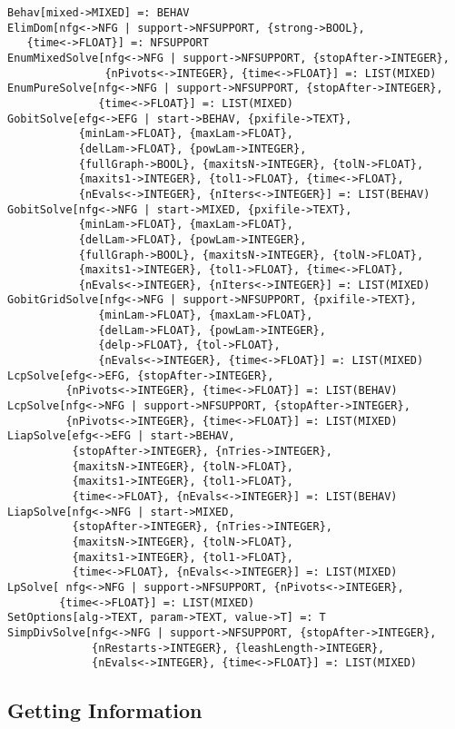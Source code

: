 \begin{verbatim}
Behav[mixed->MIXED] =: BEHAV
ElimDom[nfg<->NFG | support->NFSUPPORT, {strong->BOOL}, 
   {time<->FLOAT}] =: NFSUPPORT 
EnumMixedSolve[nfg<->NFG | support->NFSUPPORT, {stopAfter->INTEGER},
               {nPivots<->INTEGER}, {time<->FLOAT}] =: LIST(MIXED)
EnumPureSolve[nfg<->NFG | support->NFSUPPORT, {stopAfter->INTEGER}, 
              {time<->FLOAT}] =: LIST(MIXED) 
GobitSolve[efg<->EFG | start->BEHAV, {pxifile->TEXT},
           {minLam->FLOAT}, {maxLam->FLOAT},
           {delLam->FLOAT}, {powLam->INTEGER},
           {fullGraph->BOOL}, {maxitsN->INTEGER}, {tolN->FLOAT},
           {maxits1->INTEGER}, {tol1->FLOAT}, {time<->FLOAT},
           {nEvals<->INTEGER}, {nIters<->INTEGER}] =: LIST(BEHAV)
GobitSolve[nfg<->NFG | start->MIXED, {pxifile->TEXT},
           {minLam->FLOAT}, {maxLam->FLOAT},
           {delLam->FLOAT}, {powLam->INTEGER},
           {fullGraph->BOOL}, {maxitsN->INTEGER}, {tolN->FLOAT},
           {maxits1->INTEGER}, {tol1->FLOAT}, {time<->FLOAT},
           {nEvals<->INTEGER}, {nIters<->INTEGER}] =: LIST(MIXED)
GobitGridSolve[nfg<->NFG | support->NFSUPPORT, {pxifile->TEXT},
              {minLam->FLOAT}, {maxLam->FLOAT}, 
              {delLam->FLOAT}, {powLam->INTEGER}, 
              {delp->FLOAT}, {tol->FLOAT},
              {nEvals<->INTEGER}, {time<->FLOAT}] =: LIST(MIXED)
LcpSolve[efg<->EFG, {stopAfter->INTEGER},
         {nPivots<->INTEGER}, {time<->FLOAT}] =: LIST(BEHAV)
LcpSolve[nfg<->NFG | support->NFSUPPORT, {stopAfter->INTEGER},
         {nPivots<->INTEGER}, {time<->FLOAT}] =: LIST(MIXED)
LiapSolve[efg<->EFG | start->BEHAV, 
          {stopAfter->INTEGER}, {nTries->INTEGER},
          {maxitsN->INTEGER}, {tolN->FLOAT},
          {maxits1->INTEGER}, {tol1->FLOAT},
          {time<->FLOAT}, {nEvals<->INTEGER}] =: LIST(BEHAV)
LiapSolve[nfg<->NFG | start->MIXED, 
          {stopAfter->INTEGER}, {nTries->INTEGER},
          {maxitsN->INTEGER}, {tolN->FLOAT},
          {maxits1->INTEGER}, {tol1->FLOAT},
          {time<->FLOAT}, {nEvals<->INTEGER}] =: LIST(MIXED)
LpSolve[ nfg<->NFG | support->NFSUPPORT, {nPivots<->INTEGER},
        {time<->FLOAT}] =: LIST(MIXED)
SetOptions[alg->TEXT, param->TEXT, value->T] =: T
SimpDivSolve[nfg<->NFG | support->NFSUPPORT, {stopAfter->INTEGER}, 
             {nRestarts->INTEGER}, {leashLength->INTEGER},
             {nEvals<->INTEGER}, {time<->FLOAT}] =: LIST(MIXED)
\end{verbatim}

\subsection{Getting Information}

